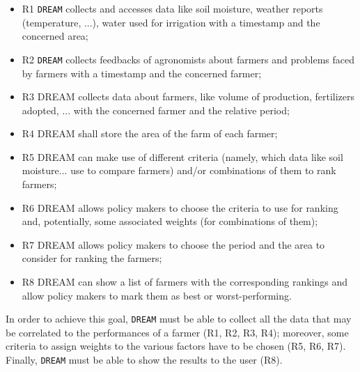 \documentclass{article}
\begin{document}
\begin{itemize}
    \item R1 \verb|DREAM| collects and accesses data like soil moisture, weather reports (temperature, ...), water used for irrigation with a timestamp and the concerned area;
    \item R2 \verb|DREAM| collects feedbacks of agronomists about farmers and problems faced by farmers with a timestamp and the concerned farmer;

    \item R3 DREAM collects data about farmers, like volume of production, fertilizers adopted, ... with the concerned farmer and the relative period;

    \item R4 DREAM shall store the area of the farm of each farmer;

    \item R5 DREAM can make use of different criteria (namely, which data like soil moisture... use to compare farmers) and/or combinations of them to rank farmers;

    \item R6 DREAM allows policy makers to choose the criteria to use for ranking and, potentially, some associated weights (for combinations of them);

    \item R7 DREAM allows policy makers to choose the period and the area to consider for ranking the farmers;

    \item R8 DREAM can show a list of farmers with the corresponding rankings and allow policy makers to mark them as best or worst-performing.
\end{itemize}
In order to achieve this goal, \verb|DREAM| must be able to collect all the data that may be correlated to the performances of a farmer (R1, R2, R3, R4); moreover, some criteria to assign weights to the various factors have to be chosen (R5, R6, R7). Finally, \verb|DREAM| must be able to show the results to the user (R8).
\end{document}
